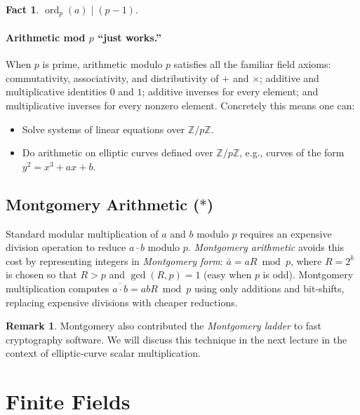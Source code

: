 \documentclass[11pt]{article}
\theoremstyle{plain}
\theoremstyle{definition}
\newtheorem{remark}[theorem]{Remark}
\newtheorem{fact}[theorem]{Fact}
\newcommand{\Z}{\mathbb{Z}}
\DeclareMathOperator{\ord}{ord}
\begin{document}
\begin{fact}
  $\ord_p(a) \mid (p-1)$.
\end{fact}

\paragraph{Arithmetic mod $p$ ``just works.''}
When $p$ is prime, arithmetic modulo $p$ satisfies all the familiar
field axioms: commutativity, associativity, and distributivity of $+$
and $\times$; additive and multiplicative identities $0$ and $1$;
additive inverses for every element; and multiplicative inverses for
every nonzero element.  Concretely this means one can:
\begin{itemize}
  \item Solve systems of linear equations over $\Z/p\Z$.
  \item Do arithmetic on elliptic curves defined over $\Z/p\Z$,
    e.g., curves of the form $y^2 = x^3 + ax + b$.
\end{itemize}

\subsection{Montgomery Arithmetic ($*$)}

Standard modular multiplication of $a$ and $b$ modulo $p$ requires an
expensive division operation to reduce $a \cdot b$ modulo $p$.
\emph{Montgomery arithmetic} avoids this cost by representing integers
in \emph{Montgomery form}: $\bar{a} = aR \bmod p$, where
$R = 2^k$ is chosen so that $R > p$ and $\gcd(R, p) = 1$ (easy when
$p$ is odd).  Montgomery multiplication computes
$\overline{a \cdot b} = ab R \bmod p$ using only additions and
bit-shifts, replacing expensive divisions with cheaper reductions.

\begin{remark}
  Montgomery also contributed the \emph{Montgomery ladder} to fast
  cryptography software.  We will discuss this technique in the next
  lecture in the context of elliptic-curve scalar multiplication.
\end{remark}

\section{Finite Fields}
\end{document}
